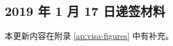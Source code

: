 \documentclass[final]{book}
\begin{document}

%
\subsection{2019 年 1 月 17 日递签材料}\label{sec:visa-material-17Jan}
本更新内容在附录 \ref{ap:visa-figures} 中有补充。
\end{document}
